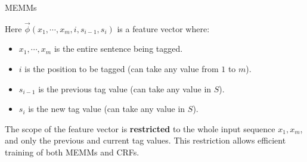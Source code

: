 \documentclass[handout]{beamer}
\begin{document}
\begin{frame}{MEMMs}
\begin{scriptsize}

Here $\vec{\phi}(x_1, \cdots, x_m, i, s_{i-1},s_i)$ is a feature vector where:
\begin{itemize}
 \item $x_1, \cdots, x_m$ is the entire sentence being tagged.
  \item $i$ is the position to be tagged (can take any value from $1$ to $m$).
  \item $s_{i-1}$ is the previous tag value (can take any value in $S$).
  \item $s_i$ is the new tag value (can take any value in $S$).
 
\end{itemize}

The scope of the feature vector is \textbf{restricted} to the whole input sequence $x_1, x_m$, and only the previous and current tag values. This restriction allows efficient training of both MEMMs and CRFs.

\end{scriptsize}
\end{frame}
\end{document}
